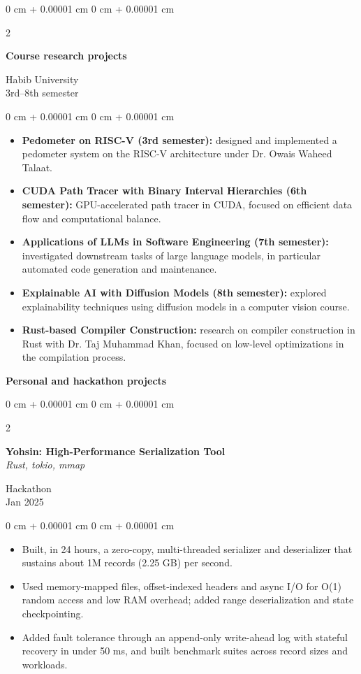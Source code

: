 \documentclass[10pt, letterpaper]{article}
\newenvironment{highlights}{
    \begin{itemize}[
        topsep=0.10 cm,
        parsep=0.10 cm,
        partopsep=0pt,
        itemsep=0pt,
        leftmargin=0 cm + 10pt
    ]
}{
    \end{itemize}
} %
\newenvironment{onecolentry}{
    \begin{adjustwidth}{
        0 cm + 0.00001 cm
    }{
        0 cm + 0.00001 cm
    }
}{
    \end{adjustwidth}
} %
\newenvironment{twocolentry}[2][]{
    \onecolentry
    \def\secondColumn{#2}
    \setcolumnwidth{\fill, 4.5 cm}
    \begin{paracol}{2}
}{
    \switchcolumn \raggedleft \secondColumn
    \end{paracol}
    \endonecolentry
} %
\begin{document}
\vspace{0.2 cm}

\begin{twocolentry}{Habib University \\ 3rd--8th semester}
    \textbf{Course research projects}
\end{twocolentry}
\begin{onecolentry}
    \begin{highlights}
        \item \textbf{Pedometer on RISC-V (3rd semester):} designed and implemented a pedometer system on the RISC-V architecture under Dr. Owais Waheed Talaat.
        \item \textbf{CUDA Path Tracer with Binary Interval Hierarchies (6th semester):} GPU-accelerated path tracer in CUDA, focused on efficient data flow and computational balance.
        \item \textbf{Applications of LLMs in Software Engineering (7th semester):} investigated downstream tasks of large language models, in particular automated code generation and maintenance.
        \item \textbf{Explainable AI with Diffusion Models (8th semester):} explored explainability techniques using diffusion models in a computer vision course.
        \item \textbf{Rust-based Compiler Construction:} research on compiler construction in Rust with Dr. Taj Muhammad Khan, focused on low-level optimizations in the compilation process.
    \end{highlights}
\end{onecolentry}

\vspace{0.3 cm}

\textbf{Personal and hackathon projects}

\vspace{0.15 cm}

\begin{twocolentry}{Hackathon \\ Jan 2025}
    \textbf{Yohsin: High-Performance Serialization Tool} \\
    \textit{Rust, tokio, mmap}
\end{twocolentry}
\begin{onecolentry}
    \begin{highlights}
        \item Built, in 24 hours, a zero-copy, multi-threaded serializer and deserializer that sustains about 1M records (2.25 GB) per second.
        \item Used memory-mapped files, offset-indexed headers and async I/O for O(1) random access and low RAM overhead; added range deserialization and state checkpointing.
        \item Added fault tolerance through an append-only write-ahead log with stateful recovery in under 50 ms, and built benchmark suites across record sizes and workloads.
    \end{highlights}
\end{onecolentry}
\end{document}
